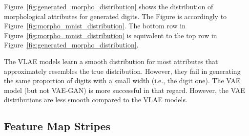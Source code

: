 Figure~\ref{fig:generated_morpho_distribution} shows the distribution of morphological attributes for generated digits.
The Figure is accordingly to Figure~\ref{fig:morpho_mnist_distribution}.
The bottom row in Figure~\ref{fig:morpho_mnist_distribution} is equivalent to the top row in Figure~\ref{fig:generated_morpho_distribution}.

The \ac{VLAE} models learn a smooth distribution for most attributes that approximately resembles the true distribution.
However, they fail in generating the same proportion of digits with a small width (i.e., the digit one).
The \ac{VAE} model (but not \ac{VAE}-\ac{GAN}) is more successful in that regard.
However, the \ac{VAE} distributions are less smooth compared to the \ac{VLAE} models.

\subsection{Feature Map Stripes}\label{subsec:feature-map-stripes}


